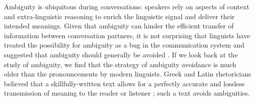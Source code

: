 \documentclass[11pt,a4paper]{article}
\begin{document}



Ambiguity is ubiquitous during conversations: speakers rely on aspects of context and extra-linguistic reasoning to enrich the linguistic signal and deliver their intended meanings. Given that ambiguity can hinder the efficient transfer of information between conversation partners, it is not surprising that linguists have treated the possibility for ambiguity as a bug in the communication system \cite{chomsky2002minimalism} and suggested that ambiguity should generally be avoided \cite{grice1975}. If we look back at the study of ambiguity, we find that the strategy of ambiguity avoidance is much older than the pronouncements by modern linguists. Greek and Latin rhetoricians believed that a skillfully-written text allows for a perfectly accurate and lossless transmission of meaning to the reader or listener \cite{ossarichardson2019}; such a text avoids ambiguities.
\end{document}
